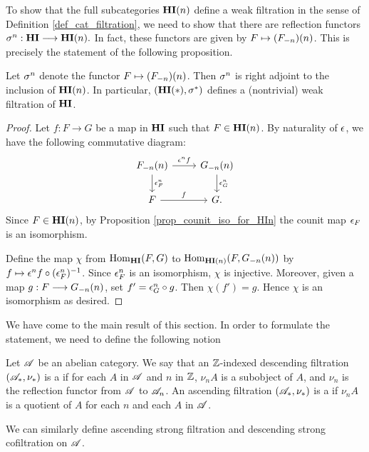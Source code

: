 To show that the full subcategories $\LHI[n]{\HI}$ define a weak
filtration in the sense of Definition \ref{def_cat_filtration}, we 
need to show that there are reflection functors $\sgHI{n}: \HI 
\to \LHI[n]{\HI}.$ In fact, these functors are given by $F \mapsto 
\LHI[n]{(\RHI[n]{F})}$. This is precisely the statement of the 
following proposition.

\begin{prop}\label{prop_HI_upper_slice}
Let $\sgHI{n}$ denote the functor $F \mapsto 
\LHI[n]{(\RHI[n]{F})}$. Then $\sgHI{n}$ is right adjoint to the 
inclusion of $\LHI[n]{\HI}$. In particular, $(\LHI[*]{\HI}, 
\sgHI{*})$ defines a (nontrivial) weak filtration of $\HI$.
\end{prop}
\begin{proof}
Let $f: F \to G$ be a map in $\HI$ such that $F \in \LHI[n]{\HI}$.
By naturality of $\cuHI$, we have the following commutative 
diagram:
\[
\begin{tikzcd}
\LHI[n]{\RHI[n]{F}} \arrow{r}{\cuHI^n f}\arrow{d}{\cuHI^n_F} 
& \LHI[n]{\RHI[n]{G}} \arrow{d}{\cuHI^n_G} \\
F \arrow{r}{f}
& G.
\end{tikzcd}
\]
Since $F \in \LHI[n]{\HI}$, by Proposition \ref{prop_counit_iso_for_HIn} 
the counit map $\cuHI_F$ is an isomorphism.

Define the map $\chi$ from $\homHI(F, G)$ to 
$\hom_{\LHI[n]{\HI}}(F, \LHI[n]{\RHI[n]{G}})$ by $f \mapsto 
\cuHI^n f \comp (\cuHI^n_F)^{-1}$. Since $\cuHI_F^n$ is an 
isomorphism, $\chi$ is injective.  Moreover, given a map $g: F 
\to \LHI[n]{\RHI[n]{G}}$, set $f' = \cuHI_G^n \comp g$. Then 
$\chi(f') = g$. Hence $\chi$ is an isomorphism as desired.
\end{proof}

We have come to the main result of this section. In order to 
formulate the statement, we need to define the following notion

\begin{defn}\label{def_strong_filtration}
Let $\Cat{A}$ be an abelian category. We say that an $\Z$-indexed 
descending filtration $(\Cat{A}_*, \nu_*)$ is a  if for each $A$ in $\Cat{A}$ and $n$ in $\Z$, $\nu_n 
A$ is a subobject of $A$, and $\nu_n$ is the reflection functor
from $\Cat{A}$ to $\Cat{A}_n$. An ascending filtration $(\Cat{A}_*, 
\nu_*)$ is a  if $\nu_n A$ is a quotient 
of $A$ for each $n$ and each $A$ in $\Cat{A}$.

We can similarly define ascending strong filtration and descending
strong cofiltration on $\Cat{A}$.
\end{defn}


